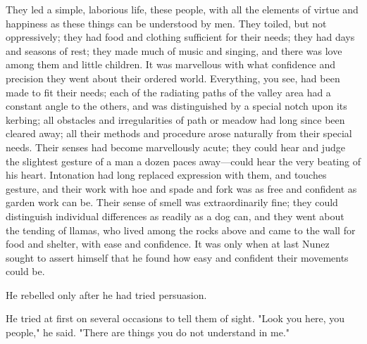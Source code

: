 \documentclass[submission]{sffms}
\begin{document}
They led a simple, laborious life, these people, with all the elements
of virtue and happiness as these things can be understood by men. They
toiled, but not oppressively; they had food and clothing sufficient
for their needs; they had days and seasons of rest; they made much of
music and singing, and there was love among them and little
children. It was marvellous with what confidence and precision they
went about their ordered world. Everything, you see, had been made to
fit their needs; each of the radiating paths of the valley area had a
constant angle to the others, and was distinguished by a special notch
upon its kerbing; all obstacles and irregularities of path or meadow
had long since been cleared away; all their methods and procedure
arose naturally from their special needs. Their senses had become
marvellously acute; they could hear and judge the slightest gesture of
a man a dozen paces away---could hear the very beating of his
heart. Intonation had long replaced expression with them, and touches
gesture, and their work with hoe and spade and fork was as free and
confident as garden work can be. Their sense of smell was
extraordinarily fine; they could distinguish individual differences as
readily as a dog can, and they went about the tending of llamas, who
lived among the rocks above and came to the wall for food and shelter,
with ease and confidence. It was only when at last Nunez sought to
assert himself that he found how easy and confident their movements
could be.

He rebelled only after he had tried persuasion.

He tried at first on several occasions to tell them of sight. "Look
you here, you people," he said. "There are things you do not
understand in me."
\end{document}
